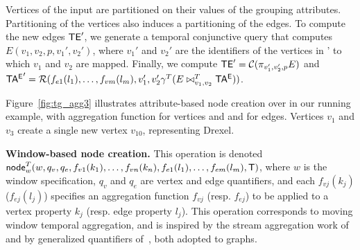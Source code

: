 Vertices of the input are partitioned on their values of the grouping
attributes.  Partitioning of the vertices also induces a partitioning
of the edges. To compute the new edges $\textsf{TE}'$, we generate a temporal
conjunctive query that computes $E(v_1,v_2,p,v_1',v_2')$, where $v_1'$
and $v_2'$ are the identifiers of the vertices in \tv' to which $v_1$
and $v_2$ are mapped.  Finally, we compute $\textsf{TE}' =
\mathcal{C}(\pi_{v_1',v_2',p}E)$ and\\ $\mathsf{TA^{E}}' =
\mathcal{R}(f_{e1}(l_1),\ldots,f_{vm}(l_m),v_1',v_2' \gamma^T (E
  \bowtie^T_{v_1,v_2} \mathsf{TA^{E}}))$.

Figure~\ref{fig:tg_agg3} illustrates attribute-based node creation
over  in our running example, with 
aggregation function for vertices and and  for edges.
Vertices $v_1$ and $v_3$ create a single new vertex $v_10$,
representing Drexel.

{\bf Window-based node creation.} This operation is denoted
$\textsf{node}^T_w(w,q_v,q_e,f_{v1}(k_1),\ldots,f_{vn}(k_n),f_{e1}(l_1),\ldots,f_{em}(l_m),\mathsf{T})$,
where $w$ is the window specification, $q_v$ and $q_e$ are vertex and
edge quantifiers, and each $f_{vj}(k_j)$ ($f_{ej}(l_j)$) specifies an
aggregation function $f_{vj}$ (resp. $f_{ej}$) to be applied to a
vertex property $k_j$ (resp. edge property $l_j$).  This operation
corresponds to moving window temporal aggregation, and is inspired by
the stream aggregation work of~\cite{Li2005} and by generalized
quantifiers of~\cite{Hsu1995}, both adopted to graphs.



